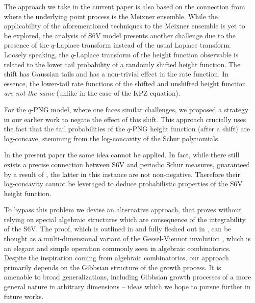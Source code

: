 \documentclass[reqno,11pt]{amsart}
\numberwithin{equation}{section}
\theoremstyle{definition}
\begin{document}
The approach we take in the current paper is also based on the connection from \cite{borodin2016stochastic_MM,BO2016_ASEP} where the underlying point process is the Meixner ensemble. While the applicability of the aforementioned techniques to the Meixner ensemble is yet to be explored, the analysis of S6V model presents another challenge due to the presence of the $q$-Laplace transform instead of the usual Laplace transform. Loosely speaking, the $q$-Laplace transform of the height function observable is related to the lower tail probability of a randomly shifted height function. The shift has Gaussian tails and has a non-trivial effect in the rate function. In essence, the lower-tail rate functions of the shifted and unshifted height function \textit{are not the same} (unlike in the case of the KPZ equation). 

For the $q$-PNG model, where one faces similar challenges, we proposed a strategy in our earlier work \cite{das2023large} to negate the effect of this shift. This approach crucially uses the fact that the tail probabilities of the $q$-PNG height function (after a shift) are log-concave, stemming from the log-concavity of the Schur polynomials \cite{Okounkov1997,Lam_Postnikov_Pylyavskyy_concavity}. {In the present paper the same idea cannot be applied. In fact, while there still exists a precise connection between S6V and {periodic Schur measures}, guaranteed by a result of \cite{IMS_KPZ_free_fermions}, the latter in this instance are not non-negative. Therefore their log-concavity cannot be leveraged to deduce probabilistic properties of the S6V height function.

To bypass this problem we devise an alternative approach, that proves  without relying on special algebraic structures which are consequence of the integrability of the S6V. The proof, which is outlined in  and fully fleshed out in , can be thought as a multi-dimensional variant of the Gessel-Viennot involution \cite{gessel1985binomial}, which is an elegant and simple operation commonly seen in algebraic combinatorics. Despite the inspiration coming from algebraic combinatorics, our approach primarily depends on the Gibbsian structure of the growth process. It is amenable to broad generalizations, including Gibbsian growth processes of a more general nature in arbitrary dimensions -- ideas which we hope to pursue further in future works.}
\end{document}
